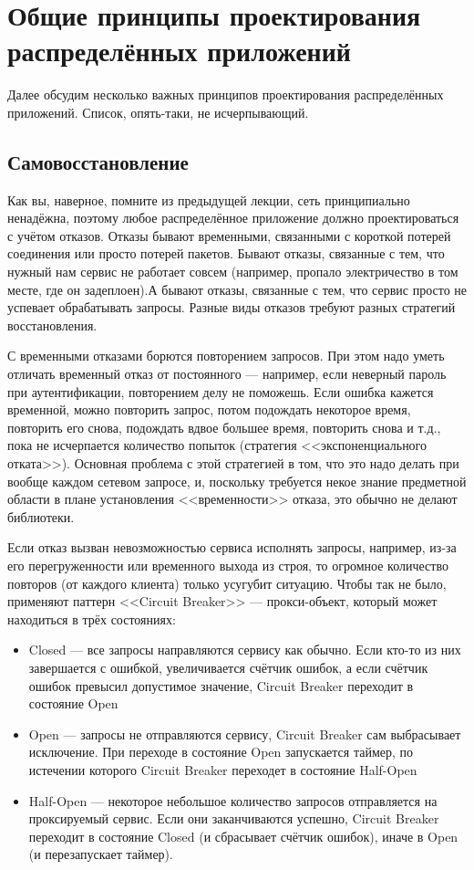 \documentclass[a5paper]{article}
\begin{document}
\section{Общие принципы проектирования распределённых приложений}

Далее обсудим несколько важных принципов проектирования распределённых приложений. Список, опять-таки, не исчерпывающий.

\subsection{Самовосстановление}

Как вы, наверное, помните из предыдущей лекции, сеть принципиально ненадёжна, поэтому любое распределённое приложение должно проектироваться с учётом отказов. Отказы бывают временными, связанными с короткой потерей соединения или просто потерей пакетов. Бывают отказы, связанные с тем, что нужный нам сервис не работает совсем (например, пропало электричество в том месте, где он задеплоен).А бывают отказы, связанные с тем, что сервис просто не успевает обрабатывать запросы. Разные виды отказов требуют разных стратегий восстановления.

С временными отказами борются повторением запросов. При этом надо уметь отличать временный отказ от постоянного --- например, если неверный пароль при аутентификации, повторением делу не поможешь. Если ошибка кажется временной, можно повторить запрос, потом подождать некоторое время, повторить его снова, подождать вдвое большее время, повторить снова и т.д., пока не исчерпается количество попыток (стратегия <<экспоненциального отката>>). Основная проблема с этой стратегией в том, что это надо делать при вообще каждом сетевом запросе, и, поскольку требуется некое знание предметной области в плане установления <<временности>> отказа, это обычно не делают библиотеки.

Если отказ вызван невозможностью сервиса исполнять запросы, например, из-за его перегруженности или временного выхода из строя, то огромное количество повторов (от каждого клиента) только усугубит ситуацию. Чтобы так не было, применяют паттерн <<Circuit Breaker>> --- прокси-объект, который может находиться в трёх состояниях:

\begin{itemize}
    \item Closed --- все запросы направляются сервису как обычно. Если кто-то из них завершается с ошибкой, увеличивается счётчик ошибок, а если счётчик ошибок превысил допустимое значение, Circuit Breaker переходит в состояние Open
    \item Open --- запросы не отправляются сервису, Circuit Breaker сам выбрасывает исключение. При переходе в состояние Open запускается таймер, по истечении которого Circuit Breaker переходет в состояние Half-Open
    \item Half-Open --- некоторое небольшое количество запросов отправляется на проксируемый сервис. Если они заканчиваются успешно, Circuit Breaker переходит в состояние Closed (и сбрасывает счётчик ошибок), иначе в Open (и перезапускает таймер).
\end{itemize}
\end{document}
